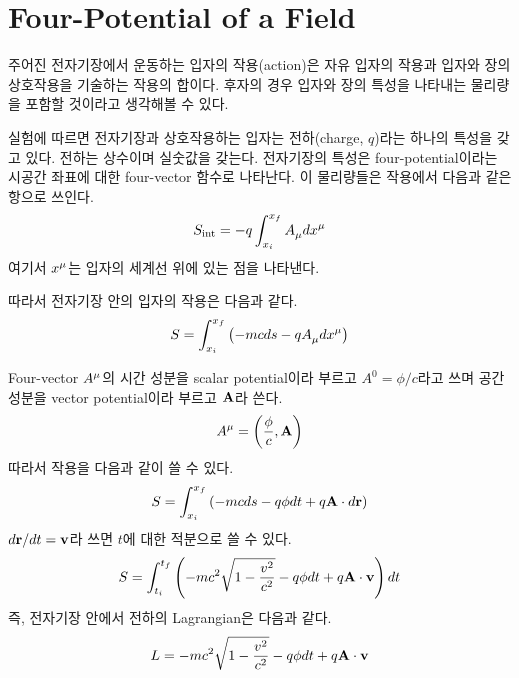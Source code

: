 \section{Four-Potential of a Field}
\label{sec:05a-02a}

주어진 전자기장에서 운동하는 입자의 작용(action)은 자유 입자의 작용과 입자와 장의 상호작용을 기술하는 작용의 합이다. 후자의 경우 입자와 장의 특성을 나타내는 물리량을 포함할 것이라고 생각해볼 수 있다.

실험에 따르면 전자기장과 상호작용하는 입자는 전하(charge, $q$)라는 하나의 특성을 갖고 있다. 전하는 상수이며 실숫값을 갖는다. 전자기장의 특성은 four-potential이라는 시공간 좌표에 대한 four-vector 함수로 나타난다. 이 물리량들은 작용에서 다음과 같은 항으로 쓰인다.
\begin{equation*}
    S_\textrm{int} = - q \int ^{x_f} _{x_i} \tensor{A}{_\mu} \tensor{dx}{^\mu}
\end{equation*}
여기서 $\tensor{x}{^\mu}$는 입자의 세계선 위에 있는 점을 나타낸다.

따라서 전자기장 안의 입자의 작용은 다음과 같다.
\begin{equation}
    S = \int ^{x_f} _{x_i} \left( - m c ds - q \tensor{A}{_\mu} \tensor{dx}{^\mu} \right)
\end{equation}

Four-vector $\tensor{A}{^\mu}$의 시간 성분을 scalar potential이라 부르고 $A^0 = \phi / c$라고 쓰며 공간 성분을 vector potential이라 부르고 $\vb{A}$라 쓴다.
\begin{equation}
    \tensor{A}{^\mu} = \left( \frac{\phi}{c}, \vb{A} \right)
\end{equation}
따라서 작용을 다음과 같이 쓸 수 있다.
\begin{equation*}
    S = \int ^{x_f} _{x_i} \left( - m c ds - q \phi dt + q \vb{A} \cdot d\vb{r} \right)
\end{equation*}
$d\vb{r} / dt = \vb{v}$라 쓰면 $t$에 대한 적분으로 쓸 수 있다.
\begin{equation}
    S = \int ^{t_f} _{t_i} \left( - m c^2 \sqrt{1 - \frac{v^2}{c^2}} - q \phi dt + q \vb{A} \cdot \vb{v} \right) dt
\end{equation}
즉, 전자기장 안에서 전하의 Lagrangian은 다음과 같다.
\begin{equation}\label{eq:ll1604}
    L = - m c^2 \sqrt{1 - \frac{v^2}{c^2}} - q \phi dt + q \vb{A} \cdot \vb{v}
\end{equation}

